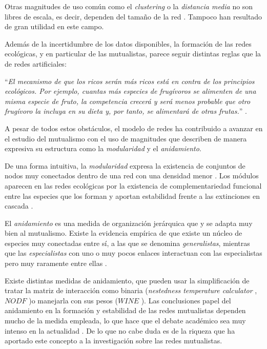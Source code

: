 Otras magnitudes de uso común como el \textit{clustering} o la \textit{distancia media} no son libres de escala, es decir, dependen del tamaño de la red \cite{olesen2006smallest}. Tampoco han resultado de gran utilidad en este campo. 

Además de la incertidumbre de los datos disponibles, la formación de las redes ecológicas, y en particular de las mutualistas, parece seguir distintas reglas que la de redes artificiales:

\enquote{\itshape El mecanismo de que los ricos serán más ricos está en contra de los principios ecológicos. Por ejemplo, cuantas más especies de frugívoros se alimenten de una misma especie de fruto, la competencia crecerá y será menos probable que otro frugívoro la incluya en su dieta y, por tanto, se alimentará de otras frutas.} \cite{montoya2006ecological}.

A pesar de todos estos obstáculos, el modelo de redes ha contribuido a avanzar en el estudio del mutualismo con el uso de magnitudes que describen de manera expresiva su estructura como la \textit{modularidad} y el \textit{anidamiento}.

De una forma intuitiva, la \textit{modularidad} expresa la existencia de conjuntos de nodos muy conectados dentro de una red con una densidad menor \cite{newman2006modularity}. Los módulos aparecen en las redes ecológicas por la existencia de complementariedad funcional entre las especies que los forman y aportan estabilidad frente a las extinciones en cascada \cite{olesen2007modularity, thebault2010stability, stouffer2011compartmentalization}.

El \textit{anidamiento} es una medida de organización jerárquica que  y se adapta muy bien al mutualismo. Existe la evidencia empírica de que existe un núcleo de especies muy conectadas entre sí, a las que se denomina \textit{generalistas}, mientras que las \textit{especialistas} con uno o muy pocos enlaces interactuan con las especialistas pero muy raramente entre ellas \cite{bascompte2003nested}.

Existe distintas medidas de anidamiento, que pueden usar la simplificación de tratar la matriz de interacción como binaria (\textit{nestedness temperature calculator} \cite{atmar1995nestedness}, $NODF$ \cite{almeida2008consistent})o manejarla con sus pesos ($WINE$ \cite{galeano2009weighted}). Las conclusiones papel del anidamiento en la formación y estabilidad de las redes mutualistas dependen mucho de la medida empleada, lo que hace que el debate académico sea muy intenso en la actualidad \cite{staniczenko2013ghost, strona2015new}. De lo que no cabe duda es de la riqueza que ha aportado este concepto a la investigación sobre las redes mutualistas.

